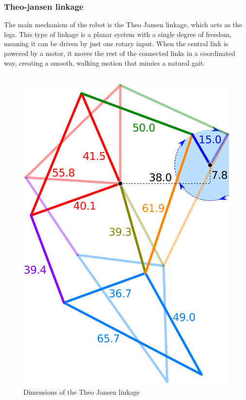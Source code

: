 \subsubsection{Theo-jansen linkage}
The main mechanism of the robot is the Theo Jansen linkage, which acts as the legs. This type of linkage is a planar system with a single degree of freedom, meaning it can be driven by just one rotary input. When the central link is powered by a motor, it moves the rest of the connected links in a coordinated way, creating a smooth, walking motion that mimics a natural gait.
\\ \\
\begin{figure} [!htb]
    \centering
    \includegraphics[width=1\linewidth]{images/Jansen's_Linkage.svg.png}
    \caption{Dimensions of the Theo Jansen linkage\cite{jansen2016strandbeest}}
    \label{fig:jansen_dimension}
\end{figure}

